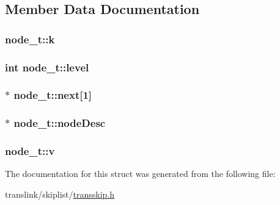 \subsection{Member Data Documentation}
\hypertarget{structnode__t_ab851bf8495cbb6ec9249dd9c1444ee34}{
\subsubsection[{k}]{ node\-\_\-t\-::k}}\label{structnode__t_ab851bf8495cbb6ec9249dd9c1444ee34}
\hypertarget{structnode__t_aea0bf952e2a3c84777c04ff7a76321f8}{
\subsubsection[{level}]{\setlength{\rightskip}{0pt plus 5cm}int node\-\_\-t\-::level}}\label{structnode__t_aea0bf952e2a3c84777c04ff7a76321f8}
\hypertarget{structnode__t_a294f71ce3f5b22412a1291a353f0acf1}{
\subsubsection[{next}]{$\ast$ node\-\_\-t\-::next\mbox{[}1\mbox{]}}}\label{structnode__t_a294f71ce3f5b22412a1291a353f0acf1}
\hypertarget{structnode__t_a02362ef9d6faa3af1fbe7bbf53ef4111}{
\subsubsection[{node\-Desc}]{$\ast$ node\-\_\-t\-::node\-Desc}}\label{structnode__t_a02362ef9d6faa3af1fbe7bbf53ef4111}
\hypertarget{structnode__t_a5916706b9b39ffacdcaeee08f063d00d}{
\subsubsection[{v}]{ node\-\_\-t\-::v}}\label{structnode__t_a5916706b9b39ffacdcaeee08f063d00d}


The documentation for this struct was generated from the following file\-:\begin{DoxyCompactItemize}
\item 
translink/skiplist/\hyperlink{transskip_8h}{transskip.\-h}\end{DoxyCompactItemize}
